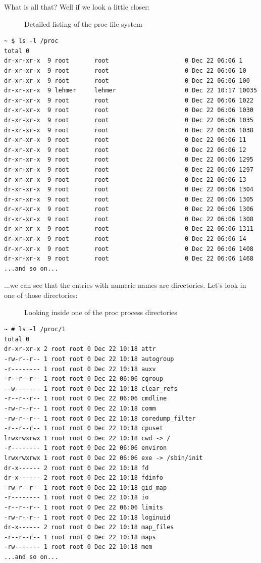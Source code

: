 \documentclass[10pt,]{book}
\numberwithin{figure}{chapter}
\DeclareRobustCommand{\drcap}[1]{\begin{figure}[H]\caption{#1}\end{figure}}
\begin{document}
What is all that? Well if we look a little closer:

\drcap{Detailed listing of the proc file system}

\begin{verbatim}
~ $ ls -l /proc
total 0
dr-xr-xr-x  9 root       root                     0 Dec 22 06:06 1
dr-xr-xr-x  9 root       root                     0 Dec 22 06:06 10
dr-xr-xr-x  9 root       root                     0 Dec 22 06:06 100
dr-xr-xr-x  9 lehmer     lehmer                   0 Dec 22 10:17 10035
dr-xr-xr-x  9 root       root                     0 Dec 22 06:06 1022
dr-xr-xr-x  9 root       root                     0 Dec 22 06:06 1030
dr-xr-xr-x  9 root       root                     0 Dec 22 06:06 1035
dr-xr-xr-x  9 root       root                     0 Dec 22 06:06 1038
dr-xr-xr-x  9 root       root                     0 Dec 22 06:06 11
dr-xr-xr-x  9 root       root                     0 Dec 22 06:06 12
dr-xr-xr-x  9 root       root                     0 Dec 22 06:06 1295
dr-xr-xr-x  9 root       root                     0 Dec 22 06:06 1297
dr-xr-xr-x  9 root       root                     0 Dec 22 06:06 13
dr-xr-xr-x  9 root       root                     0 Dec 22 06:06 1304
dr-xr-xr-x  9 root       root                     0 Dec 22 06:06 1305
dr-xr-xr-x  9 root       root                     0 Dec 22 06:06 1306
dr-xr-xr-x  9 root       root                     0 Dec 22 06:06 1308
dr-xr-xr-x  9 root       root                     0 Dec 22 06:06 1311
dr-xr-xr-x  9 root       root                     0 Dec 22 06:06 14
dr-xr-xr-x  9 root       root                     0 Dec 22 06:06 1408
dr-xr-xr-x  9 root       root                     0 Dec 22 06:06 1468
...and so on...
\end{verbatim}

...we can see that the entries with numeric names are directories. Let's
look in one of those directories:

\drcap{Looking inside one of the proc process directories}

\begin{verbatim}
~ # ls -l /proc/1
total 0
dr-xr-xr-x 2 root root 0 Dec 22 10:18 attr
-rw-r--r-- 1 root root 0 Dec 22 10:18 autogroup
-r-------- 1 root root 0 Dec 22 10:18 auxv
-r--r--r-- 1 root root 0 Dec 22 06:06 cgroup
--w------- 1 root root 0 Dec 22 10:18 clear_refs
-r--r--r-- 1 root root 0 Dec 22 06:06 cmdline
-rw-r--r-- 1 root root 0 Dec 22 10:18 comm
-rw-r--r-- 1 root root 0 Dec 22 10:18 coredump_filter
-r--r--r-- 1 root root 0 Dec 22 10:18 cpuset
lrwxrwxrwx 1 root root 0 Dec 22 10:18 cwd -> /
-r-------- 1 root root 0 Dec 22 06:06 environ
lrwxrwxrwx 1 root root 0 Dec 22 06:06 exe -> /sbin/init
dr-x------ 2 root root 0 Dec 22 10:18 fd
dr-x------ 2 root root 0 Dec 22 10:18 fdinfo
-rw-r--r-- 1 root root 0 Dec 22 10:18 gid_map
-r-------- 1 root root 0 Dec 22 10:18 io
-r--r--r-- 1 root root 0 Dec 22 06:06 limits
-rw-r--r-- 1 root root 0 Dec 22 10:18 loginuid
dr-x------ 2 root root 0 Dec 22 10:18 map_files
-r--r--r-- 1 root root 0 Dec 22 10:18 maps
-rw------- 1 root root 0 Dec 22 10:18 mem
...and so on...
\end{verbatim}
\end{document}
